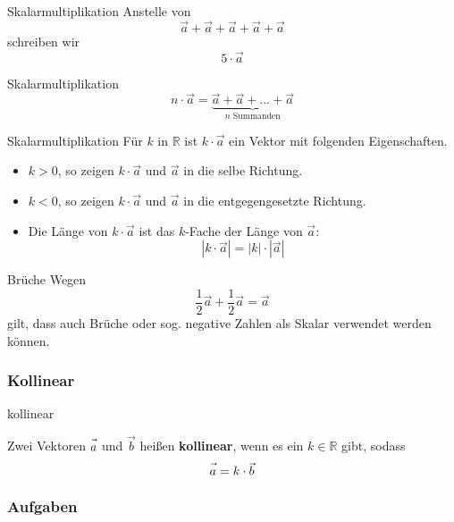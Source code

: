 \begin{beispiel}{Skalarmultiplikation}{}
  Anstelle von
  $$\vec{a}+\vec{a}+\vec{a}+\vec{a}+\vec{a}$$
  schreiben wir
  $$5\cdot{}\vec{a}$$
\end{beispiel}

\begin{definition}{Skalarmultiplikation}{}
  $$n\cdot{}\vec{a} = \underbrace{\vec{a} + \vec{a} + ... + \vec{a}}_{n \textrm{ Summanden}}$$
\end{definition}

\begin{definition}{Skalarmultiplikation}{}
  Für $k$ in $\mathbb{R}$ ist $k\cdot{}\vec{a}$ ein Vektor mit
  folgenden Eigenschaften.

  \begin{itemize}
  \item $k>0$, so zeigen $k\cdot{}\vec{a}$ und $\vec{a}$ in die selbe Richtung.
  \item $k<0$, so zeigen $k\cdot{}\vec{a}$ und $\vec{a}$ in die entgegengesetzte Richtung.
  \item Die Länge von $k\cdot{}\vec{a}$ ist das $k$-Fache der Länge
    von $\vec{a}$: $$|k\cdot{}\vec{a}| = |k|\cdot{}|\vec{a}|$$
   \end{itemize}
\end{definition}

\begin{beispiel}{Brüche}{}
  Wegen
  $$\frac12\vec{a} + \frac12\vec{a} = \vec{a}$$
  gilt, dass auch Brüche oder sog. negative Zahlen als Skalar
  verwendet werden können.
\end{beispiel}

\newpage

\subsubsection{Kollinear}

\begin{definition}{kollinear}{}\label{linearkombination}

  Zwei Vektoren $\vec{a\vphantom{b}}$ und $\vec{b}$ heißen \textbf{kollinear}, wenn es ein
  $k\in\mathbb{R}$ gibt, sodass
  $$\vec{a\vphantom{b}} = k\cdot{}\vec{b}$$
  \end{definition}
\subsubsection*{Aufgaben}
\newpage


